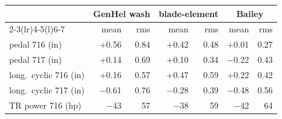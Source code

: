 \begin{tabular}{@{}lrrrrrr@{}}
\toprule
 & \multicolumn{2}{c}{GenHel wash} & \multicolumn{2}{c}{blade-element} & \multicolumn{2}{c}{Bailey} \\
\cmidrule(lr){2-3}\cmidrule(lr){4-5}\cmidrule(l){6-7}
 & mean & rms & mean & rms & mean & rms \\
\midrule
pedal 716 (in) & +0.56 & 0.84 & +0.42 & 0.48 & +0.01 & 0.27 \\
pedal 717 (in) & +0.14 & 0.69 & +0.10 & 0.34 & $-$0.22 & 0.43 \\
long.\ cyclic 716 (in) & +0.16 & 0.57 & +0.47 & 0.59 & +0.22 & 0.42 \\
long.\ cyclic 717 (in) & $-$0.61 & 0.76 & $-$0.28 & 0.39 & $-$0.48 & 0.56 \\
TR power 716 (hp) & $-$43 & 57 & $-$38 & 59 & $-$42 & 64 \\
\bottomrule
\end{tabular}
